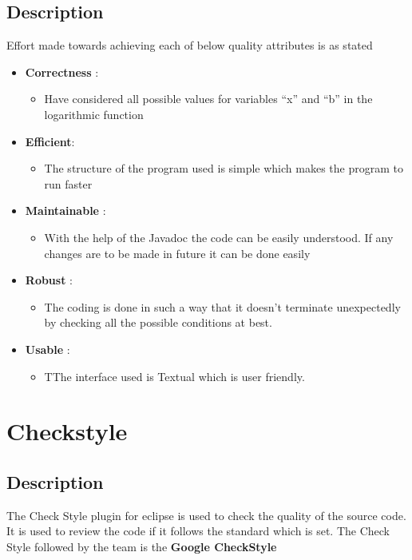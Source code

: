 \documentclass[12pt]{report}
\begin{document}
\subsection{Description}
Effort made towards achieving each of below quality attributes is as stated 
\begin{itemize}
\item \textbf{Correctness} :
\begin{itemize}
\item Have considered all possible values for variables “x” and “b” in the logarithmic function
\end{itemize}
\item \textbf{Efficient}:
\begin{itemize}
\item The structure of the program used is simple which makes the program to run faster
\end{itemize}
\item \textbf{Maintainable} :
\begin{itemize}
\item With the help of the Javadoc the code can be easily understood. If any changes are to be made in future it can be done easily
\end{itemize}
\item \textbf{Robust} :
\begin{itemize}
\item The coding is done in such a way that it doesn’t terminate unexpectedly by checking all the possible conditions at best.
\end{itemize}
\item \textbf{Usable} :
\begin{itemize}
\item TThe interface used is Textual which is user friendly.
\end{itemize}
\end{itemize}

\newpage
\section{Checkstyle}
\subsection{Description}
The Check Style plugin for eclipse is used to check the quality of the source code. It is used to review the code if it follows the standard which is set. The Check Style followed by the team is the \textbf{Google CheckStyle}
\end{document}
